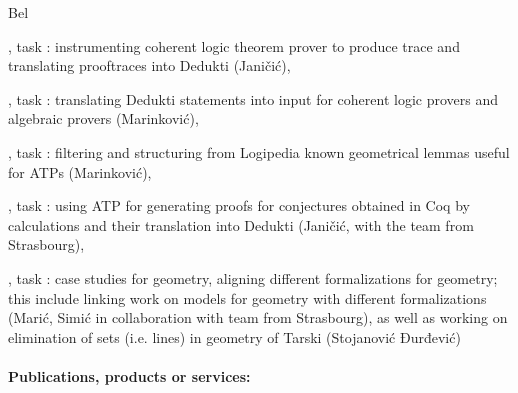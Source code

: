 \begin{sitedescription}{Bel}
  \begin{compactitem}
  \item {}, task :
    instrumenting coherent logic theorem prover to produce trace and
    translating prooftraces into Dedukti (Janičić),
  \item {}, task : translating Dedukti
    statements into input for coherent logic provers and algebraic
    provers (Marinković),
  \item {}, task : filtering and
    structuring from Logipedia known geometrical lemmas useful for
    ATPs (Marinković),
  \item {}, task : using ATP
    for generating proofs for conjectures obtained in Coq by
    calculations and their translation into Dedukti (Janičić, with the
    team from Strasbourg),
  \item {}, task
    : case studies for geometry,
    aligning different formalizations for geometry; this include
    linking work on models for geometry with different formalizations
    (Marić, Simić in collaboration with team from Strasbourg), as well
    as working on elimination of sets (i.e. lines) in geometry of
    Tarski (Stojanović Đurđević) 
  \end{compactitem}
  
  \paragraph{Publications, products or services:}

  

\end{sitedescription}
